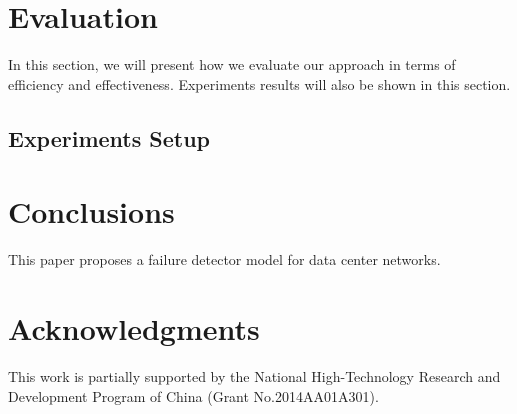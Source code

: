 \documentclass{sig-alternate-05-2015}
\begin{document}
\section{Evaluation}
In this section, we will present how we evaluate our approach in terms of efficiency and effectiveness. Experiments results will also be shown in this section.

\subsection{Experiments Setup}

\section{Conclusions}
This paper proposes a failure detector model for data center networks.


\section{Acknowledgments}
This work is partially supported by the National High-Technology Research and Development Program of China (Grant No.2014AA01A301).

%

%
%
\end{document}
